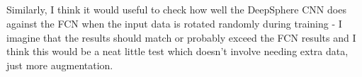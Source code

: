 \documentclass[12pt,a4paper]{article}
\newcommand{\nati}[1]{{\color[rgb]{.1,.6,.1}{NP: #1}}}
\newcommand{\mdeff}[1]{{\color[rgb]{.1,.6,.1}{MD: #1}}}
\newcommand{\TK}[1]{{\color{red}{TK: #1}}}
\newcommand{\1}{\b{1}}              %
\newcommand{\0}{\b{0}}              %
\begin{document}


\subsection{}

\begin{mdframed}[style=comment]
Similarly, I think it would useful to check how well the DeepSphere CNN does against the FCN when the input data is rotated randomly during training - I imagine that the results should match or probably exceed the FCN results and I think this would be a neat little test which doesn't involve needing extra data, just more augmentation.
\end{mdframed}
\end{document}
